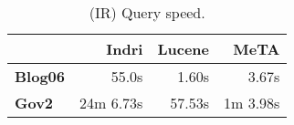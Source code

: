 \begin{table}[t]
\centering
{\small
\begin{tabular}{|l|r|r|r|}
    \hline & \textbf{Indri} & \textbf{Lucene} & \textbf{MeTA} \\
    \hline
    \textbf{Blog06} & 55.0s & 1.60s & 3.67s \\
    \textbf{Gov2} & 24m 6.73s & 57.53s & 1m 3.98s \\
    \hline
\end{tabular}
\caption{(IR) Query speed.}
\label{table:ir-query-speed}
}
\end{table}
